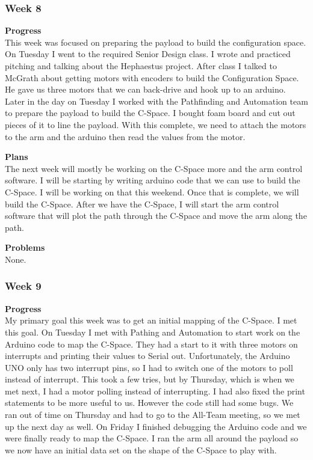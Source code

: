 \subsubsection{Week 8}
\textbf{Progress} \\ 
This week was focused on preparing the payload to build the configuration space. On Tuesday I went to the required Senior Design class. I wrote and practiced pitching and talking about the Hephaestus project. After class I talked to McGrath about getting motors with encoders to build the Configuration Space. He gave us three motors that we can back-drive and hook up to an arduino. Later in the day on Tuesday I worked with the Pathfinding and Automation team to prepare the payload to build the C-Space. I bought foam board and cut out pieces of it to line the payload. With this complete, we need to attach the motors to the arm and the arduino then read the values from the motor.

\textbf{Plans} \\ 
The next week will mostly be working on the C-Space more and the arm control software. I will be starting by writing arduino code that we can use to build the C-Space. I will be working on that this weekend. Once that is complete, we will build the C-Space. After we have the C-Space, I will start the arm control software that will plot the path through the C-Space and move the arm along the path.

\textbf{Problems} \\ 
None.

\subsubsection{Week 9}
\textbf{Progress} \\ 
My primary goal this week was to get an initial mapping of the C-Space. I met this goal. On Tuesday I met with Pathing and Automation to start work on the Arduino code to map the C-Space. They had a start to it with three motors on interrupts and printing their values to Serial out. Unfortunately, the Arduino UNO only has two interrupt pins, so I had to switch one of the motors to poll instead of interrupt. This took a few tries, but by Thursday, which is when we met next, I had a motor polling instead of interrupting. I had also fixed the print statements to be more useful to us. However the code still had some bugs. We ran out of time on Thursday and had to go to the All-Team meeting, so we met up the next day as well. On Friday I finished debugging the Arduino code and we were finally ready to map the C-Space. I ran the arm all around the payload so we now have an initial data set on the shape of the C-Space to play with.

